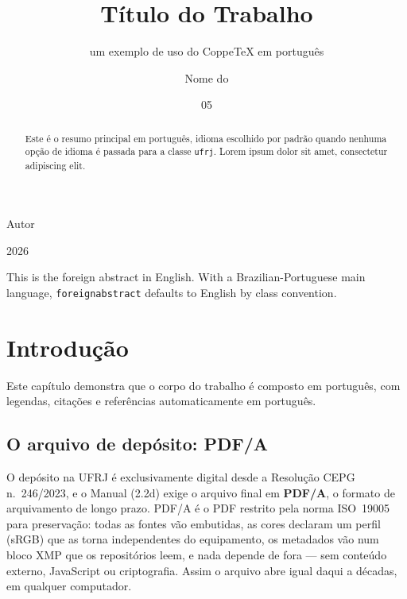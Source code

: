 \documentclass[dsc]{ufrj}
\begin{document}
  \title{Título do Trabalho}
  \subtitle{um exemplo de uso do CoppeTeX em português}
  \author{Nome do}{Autor}
  \date{05}{2026}
  \maketitle
  \frontmatter
  \begin{abstract}
    Este é o resumo principal em português, idioma escolhido por padrão
    quando nenhuma opção de idioma é passada para a classe \texttt{ufrj}.
    Lorem ipsum dolor sit amet, consectetur adipiscing elit.
  \end{abstract}
  \begin{foreignabstract}
    This is the foreign abstract in English. With a Brazilian-Portuguese
    main language, \texttt{foreignabstract} defaults to English by class
    convention.
  \end{foreignabstract}
  \tableofcontents
  \mainmatter
  \chapter{Introdução}
  Este capítulo demonstra que o corpo do trabalho é composto em português,
  com legendas, citações e referências automaticamente em português.
  \section{O arquivo de depósito: PDF/A}
  O depósito na UFRJ é exclusivamente digital desde a Resolução CEPG
  n.~246/2023, e o Manual (2.2d) exige o arquivo final em \textbf{PDF/A}, o
  formato de arquivamento de longo prazo. PDF/A é o PDF restrito pela norma
  ISO~19005 para preservação: todas as fontes vão embutidas, as cores declaram
  um perfil (sRGB) que as torna independentes do equipamento, os metadados vão
  num bloco XMP que os repositórios leem, e nada depende de fora --- sem
  conteúdo externo, JavaScript ou criptografia. Assim o arquivo abre igual daqui
  a décadas, em qualquer computador.
\end{document}
